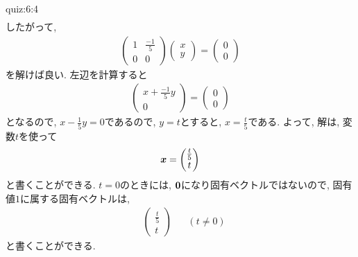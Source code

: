 \begin{answerof}{quiz:6:4}
\begin{align*}
  \end{align*}
 したがって,
  \begin{align*}
    \begin{pmatrix}1&\frac{-1}{5}\\0&0\end{pmatrix}
      \begin{pmatrix}x\\y\end{pmatrix}
=
    \begin{pmatrix}0\\0\end{pmatrix}
  \end{align*}
  を解けば良い.
  左辺を計算すると
  \begin{align*}
    \begin{pmatrix}x+\frac{-1}{5}y\\0\end{pmatrix}=
      \begin{pmatrix}0\\0\end{pmatrix}
  \end{align*}
  となるので,
   $x-\frac{1}{5}y=0$であるので,
  $y=t$とすると, $x=\frac{t}{5}$である.
  よって, 解は, 変数$t$を使って
  \begin{align*}
    \boldsymbol{x}=\begin{pmatrix}\frac{t}{5}\\t\end{pmatrix} 
  \end{align*}
  と書くことができる.
  $t=0$のときには, $\boldsymbol{0}$になり固有ベクトルではないので,
  固有値$1$に属する固有ベクトルは,
  \begin{align*}
    &\begin{pmatrix}\frac{t}{5}\\t\end{pmatrix}
       &&(t\neq 0)
  \end{align*}
  と書くことができる.


\end{answerof}
